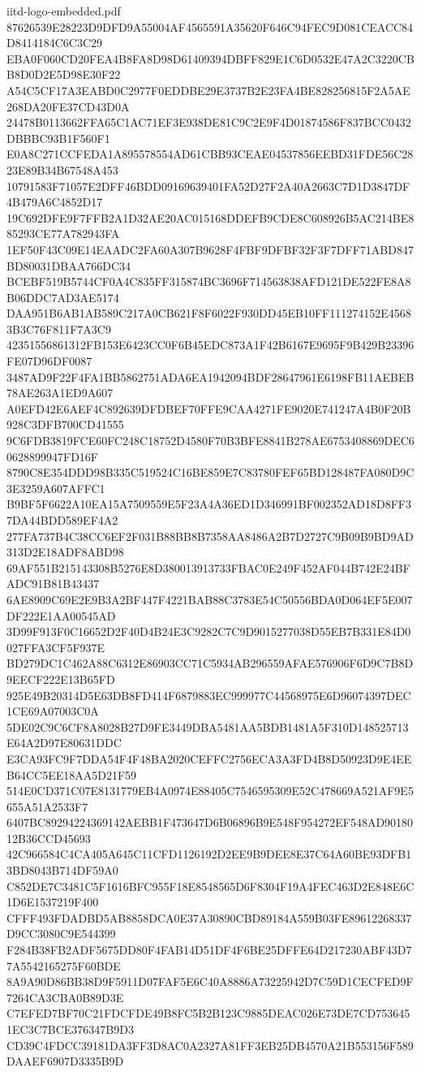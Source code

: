 \begin{filecontents*}[overwrite]{iitd-logo-embedded.pdf}
87626539E28223D9DFD9A55004AF4565591A35620F646C94FEC9D081CEACC84D8414184C6C3C29
EBA0F060CD20FEA4B8FA8D98D61409394DBFF829E1C6D0532E47A2C3220CBB8D0D2E5D98E30F22
A54C5CF17A3EABD0C2977F0EDDBE29E3737B2E23FA4BE828256815F2A5AE268DA20FE37CD43D0A
24478B0113662FFA65C1AC71EF3E938DE81C9C2E9F4D01874586F837BCC0432DBBBC93B1F560F1
E0A8C271CCFEDA1A895578554AD61CBB93CEAE04537856EEBD31FDE56C2823E89B34B67548A453
10791583F71057E2DFF46BDD09169639401FA52D27F2A40A2663C7D1D3847DF4B479A6C4852D17
19C692DFE9F7FFB2A1D32AE20AC015168DDEFB9CDE8C608926B5AC214BE885293CE77A782943FA
1EF50F43C09E14EAADC2FA60A307B9628F4FBF9DFBF32F3F7DFF71ABD847BD80031DBAA766DC34
BCEBF519B5744CF0A4C835FF315874BC3696F714563838AFD121DE522FE8A8B06DDC7AD3AE5174
DAA951B6AB1AB589C217A0CB621F8F6022F930DD45EB10FF111274152E45683B3C76F811F7A3C9
42351556861312FB153E6423CC0F6B45EDC873A1F42B6167E9695F9B429B23396FE07D96DF0087
3487AD9F22F4FA1BB5862751ADA6EA1942094BDF28647961E6198FB11AEBEB78AE263A1ED9A607
A0EFD42E6AEF4C892639DFDBEF70FFE9CAA4271FE9020E741247A4B0F20B928C3DFB700CD41555
9C6FDB3819FCE60FC248C18752D4580F70B3BFE8841B278AE6753408869DEC60628899947FD16F
8790C8E354DDD98B335C519524C16BE859E7C83780FEF65BD128487FA080D9C3E3259A607AFFC1
B9BF5F6622A10EA15A7509559E5F23A4A36ED1D346991BF002352AD18D8FF37DA44BDD589EF4A2
277FA737B4C38CC6EF2F031B88BB8B7358AA8486A2B7D2727C9B09B9BD9AD313D2E18ADF8ABD98
69AF551B215143308B5276E8D380013913733FBAC0E249F452AF044B742E24BFADC91B81B43437
6AE8909C69E2E9B3A2BF447F4221BAB88C3783E54C50556BDA0D064EF5E007DF222E1AA00545AD
3D99F913F0C16652D2F40D4B24E3C9282C7C9D9015277038D55EB7B331E84D0027FFA3CF5F937E
BD279DC1C462A88C6312E86903CC71C5934AB296559AFAE576906F6D9C7B8D9EECF222E13B65FD
925E49B20314D5E63DB8FD414F6879883EC999977C44568975E6D96074397DEC1CE69A07003C0A
5DE02C9C6CF8A8028B27D9FE3449DBA5481AA5BDB1481A5F310D148525713E64A2D97E80631DDC
E3CA93FC9F7DDA54F4F48BA2020CEFFC2756ECA3A3FD4B8D50923D9E4EEB64CC5EE18AA5D21F59
514E0CD371C07E8131779EB4A0974E88405C7546595309E52C478669A521AF9E5655A51A2533F7
6407BC89294224369142AEBB1F473647D6B06896B9E548F954272EF548AD9018012B36CCD45693
42C966584C4CA405A645C11CFD1126192D2EE9B9DEE8E37C64A60BE93DFB13BD8043B714DF59A0
C852DE7C3481C5F1616BFC955F18E8548565D6F8304F19A4FEC463D2E848E6C1D6E1537219F400
CFFF493FDADBD5AB8858DCA0E37A30890CBD89184A559B03FE89612268337D9CC3080C9E544399
F284B38FB2ADF5675DD80F4FAB14D51DF4F6BE25DFFE64D217230ABF43D77A5542165275F60BDE
8A9A90D86BB38D9F5911D07FAF5E6C40A8886A73225942D7C59D1CECFED9F7264CA3CBA0B89D3E
C7EFED7BF70C21FDCFDE49B8FC5B2B123C9885DEAC026E73DE7CD7536451EC3C7BCE376347B9D3
CD39C4FDCC39181DA3FF3D8AC0A2327A81FF3EB25DB4570A21B553156F589DAAEF6907D3335B9D

\end{filecontents*}
